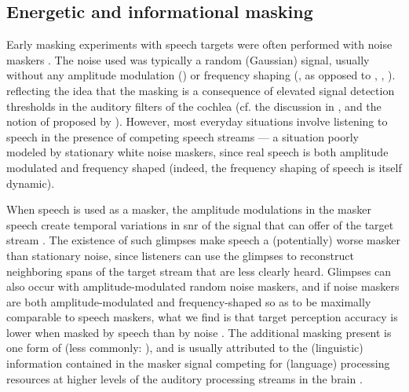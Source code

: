 \subsection{Energetic and informational masking\label{sec:InfoMasking}}
Early masking experiments with speech targets were often performed with noise maskers \citep[\eg][]{HawkinsStevens1950,Tolhurst1957b,PollackPickett1958}.  The noise used was typically a random (Gaussian) signal, usually without any amplitude modulation () or frequency shaping (, as opposed to , , \etc).   reflecting the idea that the masking is a consequence of elevated signal detection thresholds in the auditory filters of the cochlea (cf. the discussion in \citealt[96–97]{Moore2008}, and the notion of  proposed by \citealt{DurlachEtAl2003a}).  However, most everyday situations involve listening to speech in the presence of competing speech streams — a situation poorly modeled by stationary white noise maskers, since real speech is both amplitude modulated and frequency shaped (indeed, the frequency shaping of speech is itself dynamic).

\label{par:Glimpsing}When speech is used as a masker, the amplitude modulations in the masker speech create temporal variations in \ac{snr} of the signal that can offer  of the target stream \citep{FestenPlomp1990}.  The existence of such glimpses make speech a (potentially) worse masker than stationary noise, since listeners can use the glimpses to reconstruct neighboring spans of the target stream that are less clearly heard.\footnotemark{}  Glimpses can also occur with amplitude-modulated random noise maskers, and if noise maskers are both amplitude-modulated and frequency-shaped so as to be maximally comparable to speech maskers, what we find is that target perception accuracy is lower when masked by speech than by noise \citep[\eg][]{CarhartEtAl1969,LewisEtAl1988,SimpsonCooke2005}.  The additional masking present is one form of  (less commonly: ), and is usually attributed to the (linguistic) information contained in the masker signal competing for (language) processing resources at higher levels of the auditory processing streams in the brain \citep{DurlachEtAl2003a}.

